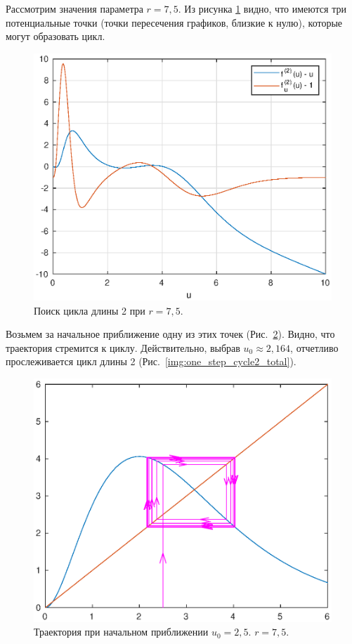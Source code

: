 Рассмотрим значения параметра $r = 7,5$. Из рисунка \ref{img:one_step_cycle2_system} видно, что имеются три потенциальные точки (точки пересечения графиков, близкие к нулю), которые могут образовать цикл.
\begin{figure}[h]
        \centering
        \includegraphics[width=0.8\linewidth]{img/one_step_cycle2_system.eps}
        \caption{Поиск цикла длины 2 при $r = 7,5$.}
        \label{img:one_step_cycle2_system}
\end{figure}
Возьмем за начальное приближение одну из этих точек (Рис.~\ref{img:one_step_cycle2_search}). Видно, что траектория стремится к циклу. Действительно, выбрав $u_0 \approx 2,164$, отчетливо прослеживается цикл длины 2 (Рис.~\ref{img:one_step_cycle2_total}).
\begin{figure}[h]
        \centering
        \includegraphics[width=0.8\linewidth]{img/one_step_cycle2_search.eps}
        \caption{Траектория при начальном приближении $u_0 = 2,5$. $r = 7,5$.}
        \label{img:one_step_cycle2_search}
\end{figure} 
